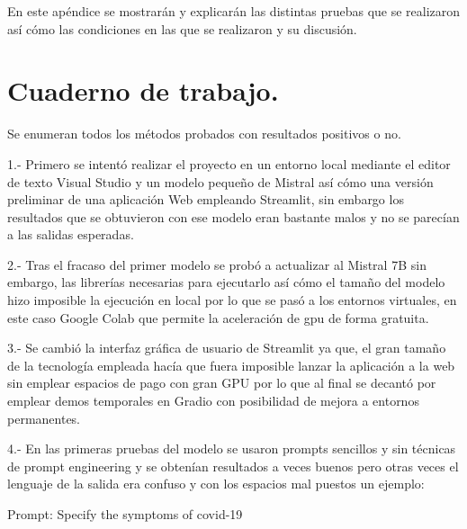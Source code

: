 
En este apéndice se mostrarán y explicarán las distintas pruebas que se realizaron así cómo las condiciones en las que se realizaron y su discusión.

\section{Cuaderno de trabajo.}

Se enumeran todos los métodos probados con resultados positivos o no.

1.- Primero se intentó realizar el proyecto en un entorno local mediante el editor de texto Visual Studio y un modelo pequeño de Mistral así cómo una versión preliminar de una aplicación Web empleando Streamlit, sin embargo los resultados que se obtuvieron con ese modelo eran bastante malos y no se parecían a las salidas esperadas.

2.- Tras el fracaso del primer modelo se probó a actualizar al Mistral 7B sin embargo, las librerías necesarias para ejecutarlo así cómo el tamaño del modelo hizo imposible la ejecución en local por lo que se pasó a los entornos virtuales, en este caso Google Colab que permite la aceleración de gpu de forma gratuita.

3.- Se cambió la interfaz gráfica de usuario de Streamlit ya que, el gran tamaño de la tecnología empleada hacía que fuera imposible lanzar la aplicación a la web sin emplear espacios de pago con gran GPU por lo que al final se decantó por emplear demos temporales en Gradio con posibilidad de mejora a entornos permanentes.

4.- En las primeras pruebas del modelo se usaron prompts sencillos y sin técnicas de prompt engineering y se obtenían resultados a veces buenos pero otras veces el lenguaje de la salida era confuso y con los espacios mal puestos un ejemplo:

Prompt: Specify the symptoms of covid-19

